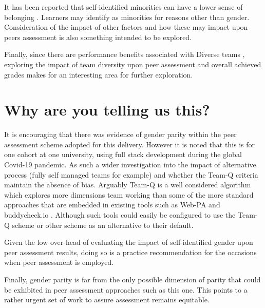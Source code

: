 \documentclass[sigconf, anonymous=true]{acmart}
\begin{document}
It has been reported that self-identified minorities can have a lower sense of belonging \cite{Mooney2020}. Learners may identify as minorities for reasons other than gender. Consideration of the impact of other factors and how these may impact upon peers assessment is also something intended to be explored.

Finally, since there are performance benefits associated with Diverse teams \cite{HBR206}, exploring the impact of team diversity upon peer assessment and overall achieved grades makes for an interesting area for further exploration.


\section{Why are you telling us this?}
It is encouraging that there was evidence of gender parity within the peer assessment scheme adopted for this delivery. However it is noted that this is for one cohort at one university, using full stack development during the global Covid-19 pandemic. As such a wider investigation into the impact of alternative process (fully self managed teams for example) and whether the Team-Q criteria maintain the absence of bias. Arguably Team-Q is a well considered algorithm which explores more dimensions team working than some of the more standard approaches that are embedded in existing tools such as Web-PA \cite{WebPA}and buddycheck.io \cite{BuddyCheck}. Although such tools could easily be configured to use the Team-Q scheme or other scheme as an alternative to their default.

Given the low over-head of evaluating the impact of self-identified gender upon peer assessment results, doing so is a practice recommendation for the occasions when peer assessment is employed.

Finally, gender parity is far from the only possible dimension of parity that could be exhibited in peer assessment approaches such as this one. This points to a rather urgent set of work to assure assessment remains equitable. 



\end{document}
